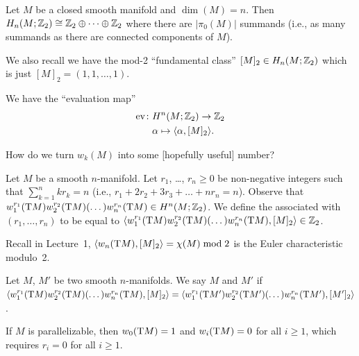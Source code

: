 \begin{recall}
Let $M$ be a closed smooth manifold and $\dim(M)=n$.
Then $H_{n}(M;\mathbb{Z}_{2})\cong\mathbb{Z}_{2}\oplus\dots\oplus\mathbb{Z}_{2}$ where there
are $|\pi_{0}(M)|$ summands (i.e., as many summands as there are
connected components of $M$).
\end{recall}

\begin{node}
We also recall we have the mod-2 ``fundamental class'' $[M]_{2}\in H_{n}(M;\mathbb{Z}_{2})$
which is just $[M]_{2}=(1,1,\dots,1)$.
\end{node}

\begin{node}
We have the ``evaluation map''
\begin{align}
\operatorname{ev}\colon & H^{n}(M;\mathbb{Z}_{2})\to\mathbb{Z}_{2}\\
&\alpha\mapsto\langle\alpha,[M]_{2}\rangle\nonumber.
\end{align}
\end{node}

\begin{puzzle}
How do we turn $w_{k}(M)$ into some [hopefully useful] number?
\end{puzzle}

\begin{definition}
Let $M$ be a smooth $n$-manifold.
Let $r_{1}$, \dots, $r_{n}\geq0$ be non-negative integers such that
$\sum^{n}_{k=1}kr_{k}=n$ (i.e.,
$r_{1}+2r_{2}+3r_{3}+\dots+nr_{n}=n$).
Observe that $w_{1}^{r_{1}}(\mathrm{T} M)w_{2}^{r_{2}}(\mathrm{T} M)(\dots)w_{n}^{r_{n}}(\mathrm{T} M)\in H^{n}(M;\mathbb{Z}_{2})$.
We define the  associated with
$(r_{1},\dots,r_{n})$ to be equal to
$\langle w_{1}^{r_{1}}(\mathrm{T} M)w_{2}^{r_{2}}(\mathrm{T} M)(\dots)w_{n}^{r_{n}}(\mathrm{T} M),[M]_{2}\rangle\in\mathbb{Z}_{2}$.
\end{definition}

\begin{remark}
Recall in Lecture~1, $\langle w_{n}(\mathrm{T} M),[M]_{2}\rangle=\chi(M)\bmod{2}$
is the Euler characteristic modulo~2.
\end{remark}

\begin{definition}
Let $M$, $M'$ be two smooth $n$-manifolds.
We say $M$ and $M'$ 
if
$\langle w_{1}^{r_{1}}(\mathrm{T} M)w_{2}^{r_{2}}(\mathrm{T} M)(\dots)w_{n}^{r_{n}}(\mathrm{T} M),[M]_{2}\rangle=\langle w_{1}^{r_{1}}(\mathrm{T} M')w_{2}^{r_{2}}(\mathrm{T} M')(\dots)w_{n}^{r_{n}}(\mathrm{T} M'),[M']_{2}\rangle$.
\end{definition}

\begin{example}
If $M$ is parallelizable, then $w_{0}(\mathrm{T} M)=1$ and $w_{i}(\mathrm{T} M)=0$ for
all $i\geq1$, which requires $r_{i}=0$ for all $i\geq1$.
\end{example}